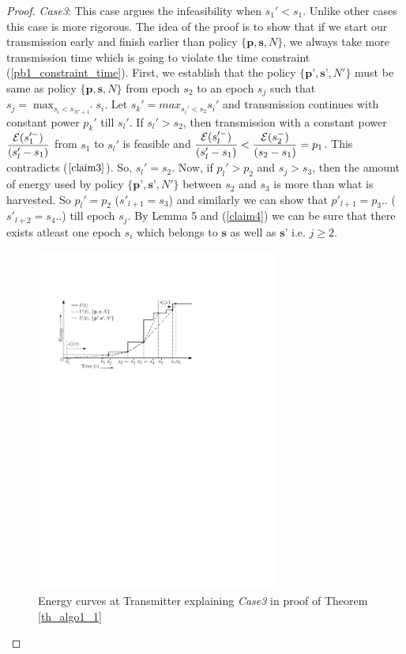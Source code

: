 \begin{proof}
\textit{Case3}: This case argues the infeasibility when $s_1'<s_1$. Unlike other cases this case is more rigorous. The idea of the proof is to show that if we start our transmission early and finish earlier than policy $\{\textbf{p},\textbf{s},N\}$, we always take more transmission time which is going to violate the time constraint (\ref{pb1_constraint_time}). First, we establish that the policy $\{\textbf{p'},\textbf{s'},N'\}$ must be same as policy $\{\textbf{p},\textbf{s},N\}$ from epoch $s_2$ to an epoch $s_j$ such that $s_j=\max_{s_i<s_{N'+1}'} s_i$. Let $s_k'=max_{s_i'<s_2}s_i'$ and transmission continues with constant power $p_k'$ till $s_l'$. If $s_l'>s_2$, then transmission with a constant power $\dfrac{\mathcal{E}(s_1'^-)}{(s_l'-s_1)} $ from $s_1$ to $s_l'$ is feasible and $\dfrac{\mathcal{E}(s_l'^-)}{(s_l'-s_1)}<\dfrac{\mathcal{E}(s_2^-)}{(s_2-s_1)}=p_1$. This contradicts ($\ref{claim3}$). So, $s_l'=s_2$. Now, if $p_l'>p_2$ and $s_j>s_3$, then the amount of energy used by policy $\{\textbf{p'},\textbf{s'},N'\}$ between $s_2$ and $s_3$ is more than what is harvested. So $p_l'=p_2$ ($s'_{l+1}=s_3$) and similarly we can show that $p'_{l+1}=p_3$.. ($ s'_{l+2}=s_4$..) till epoch $s_j$. By Lemma 5 and (\ref{claim4}) we can be sure that there exists atleast one epoch $s_i$ which belongs to $\textbf{s}$ as well as $\textbf{s'}$ i.e. $j\ge 2$.

\begin{figure}[htb]
\centering
\centerline{\includegraphics[width=8cm]{Theorem1_sufficient.pdf}}
\caption{Energy curves at Transmitter explaining \textit{Case3} in proof of Theorem \ref{th_algo1_1}}
\label{Theorem1_figure}
\end{figure}


\end{proof}
